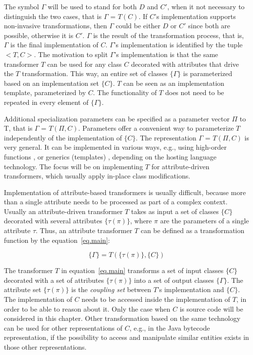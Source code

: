 \noindent The symbol $\Gamma$ will be used to stand for both $D$ and $C'$, when it not necessary to distinguish the two cases, that is $\Gamma$ = $T(C)$. If  $C$'s implementation supports non-invasive transformations, then $\Gamma$ could be either $D$ or $C'$ since both are possible, otherwise it is $C'$. $\Gamma$ is the result of the transformation process, that is, $\Gamma$ is the final implementation of $C$. $\Gamma$'s implementation is identified by the tuple $<T, C>$. The motivation to split $\Gamma$'s implementation is that the same transformer $T$ can be used for any class $C$ decorated with attributes that drive the $T$ transformation. This way, an entire set of classes $\{\Gamma\}$ is parameterized based on an implementation set $\{C\}$. $T$ can be seen as an implementation template, parameterized by $C$. The functionality of $T$ does not need to be repeated in every element of $\{\Gamma\}$.

Additional specialization parameters can be specified as a parameter vector $\Pi$ to T, that is $\Gamma$ = $T(\Pi, C)$. Parameters offer a convenient way to parameterize $T$ independently of the implementation of $\{C\}$. The representation $\Gamma$ = $T(\Pi, C)$ is very general. It can be implemented in various ways, e.g., using high-order functions \cite{mozart.04}, or generics (templates) \cite{generative.00}, depending on the hosting language technology. The focus will be on implementing $T$ for attribute-driven transformers, which usually apply in-place class modifications.

Implementation of attribute-based transformers is usually difficult, because more than a single attribute needs to be processed as part of a complex context. Usually an attribute-driven transformer $T$ takes as input a set of classes $\{C\}$ decorated with several attributes $\{\tau(\pi)\}$, where $\pi$ are the parameters of a single attribute $\tau$. Thus, an attribute transformer $T$ can be defined as a transformation function by the equation~\ref{eq.main}:

\begin{equation}
\{\Gamma\} = T(\{\tau(\pi)\}, \{C\})
\label{eq.main}
\end{equation}

\noindent The transformer $T$ in equation~\ref{eq.main} transforms a set of input classes $\{C\}$ decorated with a set of attributes $\{\tau(\pi)\}$ into a set of output classes $\{\Gamma\}$. The attribute set $\{\tau(\pi)\}$ is the \textit{coupling set} between $T$'s implementation and $\{C\}$.
%
The implementation of $C$ needs to be accessed inside the implementation of $T$, in order to be able to reason about it. Only the case when $C$ is source code will be considered in this chapter. Other transformation based on the same technology can be used for other representations of $C$, e.g., in the Java bytecode representation, if the possibility to access and manipulate similar entities exists in those other representations.

